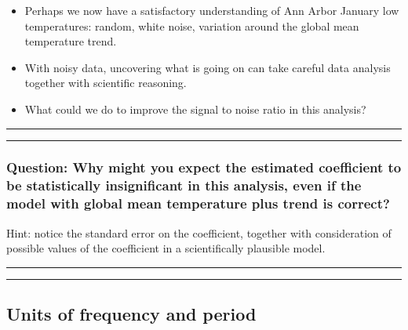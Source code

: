 \documentclass[]{article}
\begin{document}
\begin{itemize}
\item
  Perhaps we now have a satisfactory understanding of Ann Arbor January
  low temperatures: random, white noise, variation around the global
  mean temperature trend.
\item
  With noisy data, uncovering what is going on can take careful data
  analysis together with scientific reasoning.
\item
  What could we do to improve the signal to noise ratio in this
  analysis?
\end{itemize}

\begin{center}\rule{0.5\linewidth}{\linethickness}\end{center}

\begin{center}\rule{0.5\linewidth}{\linethickness}\end{center}

\subsubsection{Question: Why might you expect the estimated coefficient
to be statistically insignificant in this analysis, even if the model
with global mean temperature plus trend is
correct?}\label{question-why-might-you-expect-the-estimated-coefficient-to-be-statistically-insignificant-in-this-analysis-even-if-the-model-with-global-mean-temperature-plus-trend-is-correct}

Hint: notice the standard error on the coefficient, together with
consideration of possible values of the coefficient in a scientifically
plausible model.



\begin{center}\rule{0.5\linewidth}{\linethickness}\end{center}

\begin{center}\rule{0.5\linewidth}{\linethickness}\end{center}

\subsection{Units of frequency and
period}\label{units-of-frequency-and-period}
\end{document}
